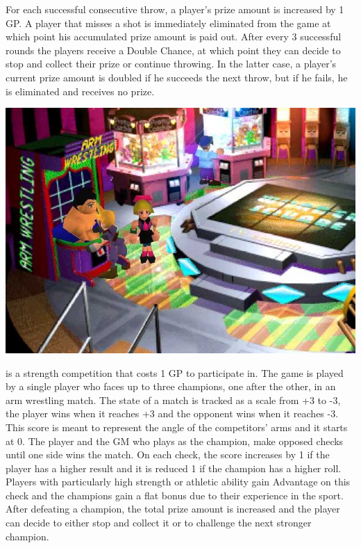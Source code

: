 For each successful consecutive throw, a player's prize amount is increased by 1 GP.
A player that misses a shot is immediately eliminated from the game at which point his accumulated prize amount is paid out.
After every 3 successful rounds the players receive a Double Chance, at which point they can decide to stop and collect their prize or continue throwing.
In the latter case, a player's current prize amount is doubled if he succeeds the next throw, but if he fails, he is eliminated and receives no prize.
%
\vfill
%
%
\vfill
%
%
%
%
\begin{center} \includegraphics[width=\columnwidth]{./art/goldsaucer/armwrestling.jpg} \end{center}
 is a strength competition that costs 1 GP to participate in.
The game is played by a single player who faces up to three champions, one after the other, in an arm wrestling match.
The state of a match is tracked as a scale from +3 to -3, the player wins when it reaches +3 and the opponent wins when it reaches -3.
This score is meant to represent the angle of the competitors' arms and it starts at 0.
The player and the GM who plays as the champion, make opposed checks until one side wins the match.
On each check, the score increases by 1 if the player has a higher result and it is reduced 1 if the champion has a higher roll.
Players with particularly high strength or athletic ability gain Advantage on this check and the champions gain a flat bonus due to their experience in the sport.
After defeating a champion, the total prize amount is increased and the player can decide to either stop and collect it or to challenge the next stronger champion.
